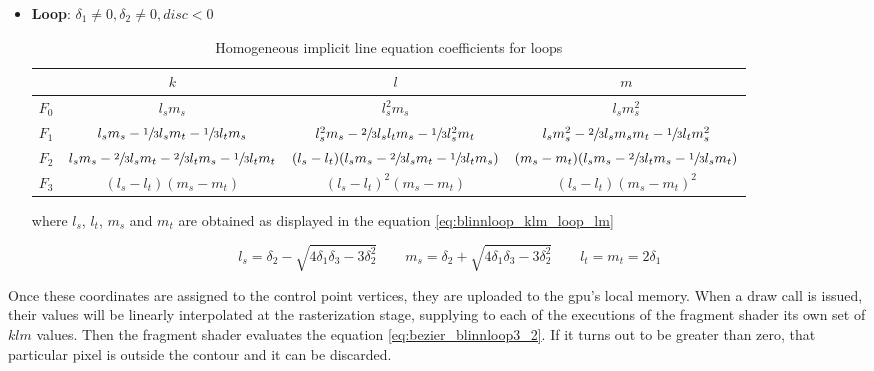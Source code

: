 \documentclass[\topdir/main.tex]{subfiles}
\begin{document}
\begin{itemize}
    
    \item \textbf{Loop}: $\delta_1 \neq 0, \delta_2 \neq 0, disc < 0$
        \begin{table}[H]
            \centering
            \scriptsize
            \begin{tabular}{|l|c|c|c|}
                \hline
                \qquad&           $k$ &               $l$ &               $m$ \\\hline
                $F_0$ &     $l_s m_s$ &         $l_s^2 m_s$ &       $l_s m_s^2 $ \\\hline
                $F_1$ &     $l_s m_s - \sfrac{1}{3} l_s m_t - \sfrac{1}{3} l_t m_s$ &       
                            $l_s^2 m_s - \sfrac{2}{3} l_s l_t  m_s - \sfrac{1}{3} l_s^2 m_t$ &         
                            $l_s m_s^2 - \sfrac{2}{3} l_s m_s m_t - \sfrac{1}{3} l_t m_s^2$ \\\hline
                $F_2$ &     $l_s m_s - \sfrac{2}{3} l_s m_t - \sfrac{2}{3} l_t m_s - \sfrac{1}{3} l_t m_t$ &
                            $(l_s-l_t)(l_s m_s - \sfrac{2}{3} l_s m_t - \sfrac{1}{3} l_t m_s)$ &
                            $(m_s-m_t)(l_s m_s - \sfrac{2}{3} l_t m_s - \sfrac{1}{3} l_s m_t)$ \\\hline
                $F_3$ &     $(l_s - l_t) (m_s - m_t)$ &  
                            $(l_s - l_t)^2 (m_s - m_t)$ &  
                            $(l_s - l_t) (m_s - m_t)^2$ \\\hline
            \end{tabular}
            \caption{Homogeneous implicit line equation coefficients for loops}
            \label{tab:blinnloop_klm_loop}
        \end{table}
        
        where $l_s$, $l_t$, $m_s$ and $m_t$ are obtained as displayed in the equation \eqref{eq:blinnloop_klm_loop_lm}
        
        \begin{equation} \label{eq:blinnloop_klm_loop_lm}
            l_s = \delta_2 - \sqrt{4\delta_1\delta_3 - 3\delta_2^2} \qquad
            m_s = \delta_2 + \sqrt{4\delta_1\delta_3 - 3\delta_2^2} \qquad
            l_t = m_t = 2 \delta_1
        \end{equation}
    
\end{itemize}

Once these coordinates are assigned to the control point vertices, they are uploaded to the \gls{gpu}'s local memory. When a draw call is issued, their values will be linearly interpolated at the rasterization stage, supplying to each of the executions of the fragment shader its own set of $klm$ values. Then the fragment shader evaluates the equation \eqref{eq:bezier_blinnloop3_2}. If it turns out to be greater than zero, that particular pixel is outside the contour and it can be discarded.\newline
\end{document}
